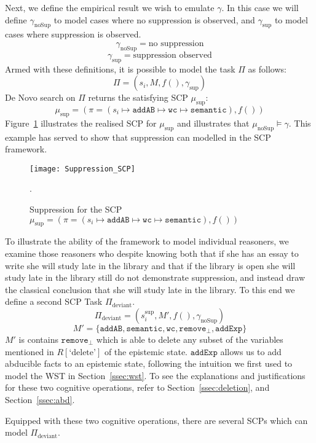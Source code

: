 Next, we define the empirical result we wish to emulate $\gamma$. In this case we will define $\gamma_\text{noSup}$ to model cases where no suppression is observed, and $\gamma_{\text{sup}}$ to model cases where suppression is observed.
\[\gamma_{\text{noSup}} = \text{no suppression} \]
\[\gamma_{\text{sup}} = \text{suppression observed} \]
Armed with these definitions, it is possible to model the task $\Pi$ as follows:
\[\Pi=(s_i,M,f(),\gamma_{\text{sup}})\]
De Novo search on $\Pi$ returns the satisfying SCP $\mu_\text{sup}$:
\[\mu_\text{sup}=(\pi=(s_i \longmapsto \texttt{addAB} \longmapsto \texttt{wc} \longmapsto \texttt{semantic}),f())\]
Figure~\ref{fig:Suppression_SCP} illustrates the realised SCP for $\mu_\text{sup}$ and illustrates that $\mu_\text{noSup} \models \gamma$. This example has served to show that suppression can modelled in the SCP framework.

\begin{figure}
\centering \texttt{[image: Suppression\_SCP]}
\caption{Suppression for the SCP $\mu_\text{sup}=(\pi=(s_i \longmapsto \texttt{addAB} \longmapsto \texttt{wc} \longmapsto \texttt{semantic}),f())$}.
\label{fig:Suppression_SCP}
\end{figure}


To illustrate the ability of the framework to model individual reasoners, we examine those reasoners who despite knowing both that if she has an essay to write she will study late in the library and that if the library is open she will study late in the library still do not demonstrate suppression, and instead draw the classical conclusion that she will study late in the library. To this end we define a second SCP Task $\Pi_\text{deviant}$.
\[\Pi_\text{deviant}=(s_i^{\text{sup}},M',f(),\gamma_{\text{noSup}})\]
\[M'=\{\texttt{addAB}, \texttt{semantic}, \texttt{wc}, \texttt{remove}_\bot, \texttt{addExp}\}\]
$M'$ is contains $\texttt{remove}_\bot$ which is able to delete any subset of the variables mentioned in $R[\text{`delete'}]$ of the epistemic state. $\texttt{addExp}$ allows us to add abducible facts to an epistemic state, following the intuition we first used to model the WST in Section~\ref{ssec:wst}. To see the explanations and justifications for these two cognitive operations, refer to Section~\ref{ssec:deletion}, and Section~\ref{ssec:abd}.

Equipped with these two cognitive operations, there are several SCPs which can model $\Pi_\text{deviant}$.

